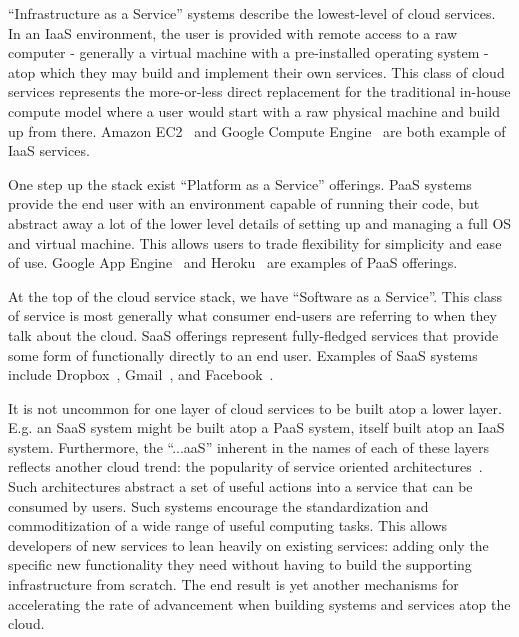 \begin{packed_desc}
\item[IaaS:] ``Infrastructure as a Service'' systems describe the
  lowest-level of cloud services. In an IaaS environment, the user is
  provided with remote access to a raw computer - generally a virtual
  machine with a pre-installed operating system - atop which they may
  build and implement their own services. This class of cloud services
  represents the more-or-less direct replacement for the traditional
  in-house compute model where a user would start with a raw physical
  machine and build up from there. Amazon EC2~\cite{amazon-ec2} and
  Google Compute Engine~\cite{google-compute} are both example of IaaS
  services.
\item[PaaS:] One step up the stack exist ``Platform as a Service''
  offerings. PaaS systems provide the end user with an environment
  capable of running their code, but abstract away a lot of the lower
  level details of setting up and managing a full OS and virtual
  machine. This allows users to trade flexibility for simplicity and
  ease of use. Google App Engine~\cite{google-appengine} and
  Heroku~\cite{heroku} are examples of PaaS offerings.
\item[SaaS:] At the top of the cloud service stack, we have ``Software
  as a Service''. This class of service is most generally what
  consumer end-users are referring to when they talk about the
  cloud. SaaS offerings represent fully-fledged services that provide
  some form of functionally directly to an end user. Examples of SaaS
  systems include Dropbox~\cite{dropbox}, Gmail~\cite{google-gmail},
  and Facebook~\cite{facebook}.
\end{packed_desc}

It is not uncommon for one layer of cloud services to be built atop a
lower layer. E.g. an SaaS system might be built atop a PaaS system,
itself built atop an IaaS system. Furthermore, the ``...aaS'' inherent
in the names of each of these layers reflects another cloud trend: the
popularity of service oriented architectures~\cite{Valipour2009}. Such
architectures abstract a set of useful actions into a service that can
be consumed by users. Such systems encourage the standardization and
commoditization of a wide range of useful computing tasks. This allows
developers of new services to lean heavily on existing services:
adding only the specific new functionality they need without having to
build the supporting infrastructure from scratch. The end result is
yet another mechanisms for accelerating the rate of advancement when
building systems and services atop the cloud.

